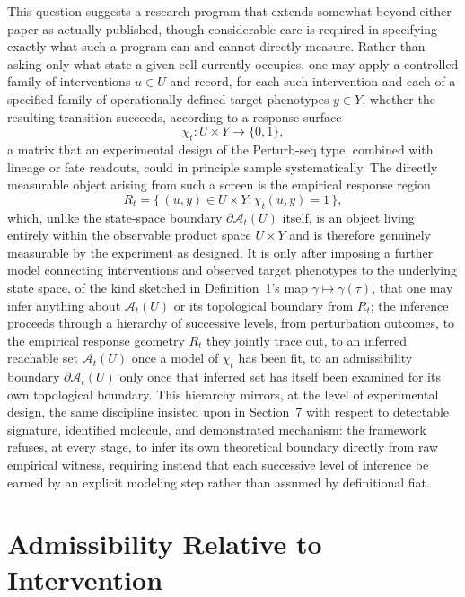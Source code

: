 \documentclass[11pt]{article}
\begin{document}
This question suggests a research program that extends somewhat beyond either paper as actually published, though considerable care is required in specifying exactly what such a program can and cannot directly measure. Rather than asking only what state a given cell currently occupies, one may apply a controlled family of interventions $u \in U$ and record, for each such intervention and each of a specified family of operationally defined target phenotypes $y \in Y$, whether the resulting transition succeeds, according to a response surface
\begin{equation}
\chi_t : U \times Y \to \{0,1\},
\end{equation}
a matrix that an experimental design of the Perturb-seq type, combined with lineage or fate readouts, could in principle sample systematically. The directly measurable object arising from such a screen is the empirical response region
\begin{equation}
R_t = \bigl\{\, (u,y) \in U \times Y : \chi_t(u,y) = 1 \,\bigr\},
\end{equation}
which, unlike the state-space boundary $\partial \mathcal{A}_t(U)$ itself, is an object living entirely within the observable product space $U \times Y$ and is therefore genuinely measurable by the experiment as designed. It is only after imposing a further model connecting interventions and observed target phenotypes to the underlying state space, of the kind sketched in Definition~1's map $\gamma \mapsto \gamma(\tau)$, that one may infer anything about $\mathcal{A}_t(U)$ or its topological boundary from $R_t$; the inference proceeds through a hierarchy of successive levels, from perturbation outcomes, to the empirical response geometry $R_t$ they jointly trace out, to an inferred reachable set $\mathcal{A}_t(U)$ once a model of $\chi_t$ has been fit, to an admissibility boundary $\partial \mathcal{A}_t(U)$ only once that inferred set has itself been examined for its own topological boundary. This hierarchy mirrors, at the level of experimental design, the same discipline insisted upon in Section~7 with respect to detectable signature, identified molecule, and demonstrated mechanism: the framework refuses, at every stage, to infer its own theoretical boundary directly from raw empirical witness, requiring instead that each successive level of inference be earned by an explicit modeling step rather than assumed by definitional fiat.

\section{Admissibility Relative to Intervention}
\end{document}
